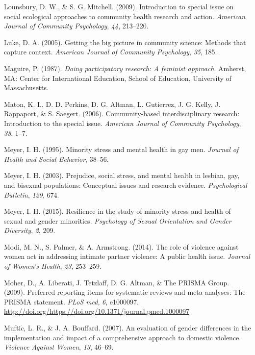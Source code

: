 \documentclass[11pt,]{tufte-book}
\begin{document}
\hypertarget{ref-lounsbury2009introduction}{}
Lounsbury, D. W., \& S. G. Mitchell. (2009). Introduction to special
issue on social ecological approaches to community health research and
action. \emph{American Journal of Community Psychology}, \emph{44},
213--220.

\hypertarget{ref-luke2005getting}{}
Luke, D. A. (2005). Getting the big picture in community science:
Methods that capture context. \emph{American Journal of Community
Psychology}, \emph{35}, 185.

\hypertarget{ref-maguire1987doing}{}
Maguire, P. (1987). \emph{Doing participatory research: A feminist
approach}. Amherst, MA: Center for International Education, School of
Education, University of Massachusetts.

\hypertarget{ref-maton2006community}{}
Maton, K. I., D. D. Perkins, D. G. Altman, L. Gutierrez, J. G. Kelly, J.
Rappaport, \& S. Saegert. (2006). Community-based interdisciplinary
research: Introduction to the special issue. \emph{American Journal of
Community Psychology}, \emph{38}, 1--7.

\hypertarget{ref-meyer1995minority}{}
Meyer, I. H. (1995). Minority stress and mental health in gay men.
\emph{Journal of Health and Social Behavior}, 38--56.

\hypertarget{ref-meyer2003prejudice}{}
Meyer, I. H. (2003). Prejudice, social stress, and mental health in
lesbian, gay, and bisexual populations: Conceptual issues and research
evidence. \emph{Psychological Bulletin}, \emph{129}, 674.

\hypertarget{ref-meyer2015resilience}{}
Meyer, I. H. (2015). Resilience in the study of minority stress and
health of sexual and gender minorities. \emph{Psychology of Sexual
Orientation and Gender Diversity}, \emph{2}, 209.

\hypertarget{ref-modi2014role}{}
Modi, M. N., S. Palmer, \& A. Armstrong. (2014). The role of violence
against women act in addressing intimate partner violence: A public
health issue. \emph{Journal of Women's Health}, \emph{23}, 253--259.

\hypertarget{ref-moher2009preferred}{}
Moher, D., A. Liberati, J. Tetzlaff, D. G. Altman, \& The PRISMA Group.
(2009). Preferred reporting items for systematic reviews and
meta-analyses: The PRISMA statement. \emph{PLoS med}, \emph{6},
e1000097.
\url{http://doi.org/https://doi.org/10.1371/journal.pmed.1000097}

\hypertarget{ref-muftic2007evaluation}{}
Mufti\(\acute{c}\), L. R., \& J. A. Bouffard. (2007). An evaluation of
gender differences in the implementation and impact of a comprehensive
approach to domestic violence. \emph{Violence Against Women}, \emph{13},
46--69.
\end{document}
